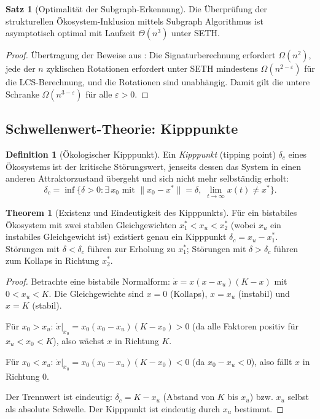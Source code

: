 ﻿\documentclass[a4paper,12pt]{article}
\theoremstyle{definition}
\newtheorem{definition}{Definition}
\newtheorem{satz}{Satz}
\newtheorem{theorem}{Theorem}
\begin{document}
\begin{satz}[Optimalität der Subgraph-Erkennung]
	\label{satz:optimalitaet_subgraph}
	Die Überprüfung der strukturellen Ökosystem-Inklusion mittels Subgraph Algorithmus ist asymptotisch optimal mit Laufzeit $\Theta(n^3)$ unter SETH.
\end{satz}

\begin{proof}
	Übertragung der Beweise aus \cite{epp2026subgraph}: Die Signaturberechnung erfordert $\Omega(n^2)$, jede der $n$ zyklischen Rotationen erfordert unter SETH mindestens $\Omega(n^{2-\varepsilon})$ für die LCS-Berechnung, und die Rotationen sind unabhängig. Damit gilt die untere Schranke $\Omega(n^{3-\varepsilon})$ für alle $\varepsilon > 0$. \qedhere
\end{proof}

\subsection{Schwellenwert-Theorie: Kipppunkte}

\begin{definition}[Ökologischer Kipppunkt]
	Ein \emph{Kipppunkt} (tipping point) $\delta_c$ eines Ökosystems ist der kritische Störungswert, jenseits dessen das System in einen anderen Attraktorzustand übergeht und sich nicht mehr selbständig erholt:
	\[
	\delta_c = \inf\bigl\{\delta > 0 : \exists\, x_0 \text{ mit } \|x_0 - x^*\| = \delta,\; \lim_{t\to\infty} x(t) \neq x^*\bigr\}.
	\]
\end{definition}

\begin{theorem}[Existenz und Eindeutigkeit des Kipppunkts]
	\label{thm:kipppunkt}
	Für ein bistabiles Ökosystem mit zwei stabilen Gleichgewichten $x_1^* < x_u < x_2^*$ (wobei $x_u$ ein instabiles Gleichgewicht ist) existiert genau ein Kipppunkt $\delta_c = x_u - x_1^*$. Störungen mit $\delta < \delta_c$ führen zur Erholung zu $x_1^*$; Störungen mit $\delta > \delta_c$ führen zum Kollaps in Richtung $x_2^*$.
\end{theorem}

\begin{proof}
	Betrachte eine bistabile Normalform: $\dot{x} = x(x - x_u)(K - x)$ mit $0 < x_u < K$. Die Gleichgewichte sind $x=0$ (Kollaps), $x = x_u$ (instabil) und $x = K$ (stabil).

	Für $x_0 > x_u$: $\dot{x}|_{x_0} = x_0(x_0 - x_u)(K - x_0) > 0$ (da alle Faktoren positiv für $x_u < x_0 < K$), also wächst $x$ in Richtung $K$. 

	Für $x_0 < x_u$: $\dot{x}|_{x_0} = x_0(x_0 - x_u)(K - x_0) < 0$ (da $x_0 - x_u < 0$), also fällt $x$ in Richtung $0$.

	Der Trennwert ist eindeutig: $\delta_c = K - x_u$ (Abstand von $K$ bis $x_u$) bzw. $x_u$ selbst als absolute Schwelle. Der Kipppunkt ist eindeutig durch $x_u$ bestimmt. \qedhere
\end{proof}
\end{document}
